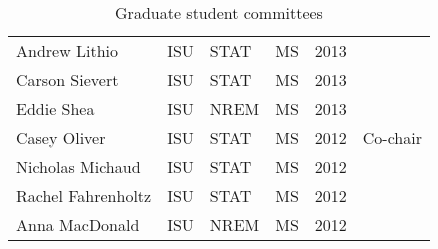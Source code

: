 \begin{table}[h]
\begin{tabular}{llllll}
  Andrew Lithio & ISU & STAT & MS & 2013 &  \\ 
  Carson Sievert & ISU & STAT & MS & 2013 &  \\ 
  Eddie Shea & ISU & NREM & MS & 2013 &  \\ 
  Casey Oliver & ISU & STAT & MS & 2012 & Co-chair \\ 
  Nicholas Michaud & ISU & STAT & MS & 2012 &  \\ 
  Rachel Fahrenholtz & ISU & STAT & MS & 2012 &  \\ 
  Anna MacDonald & ISU & NREM & MS & 2012 &  \\ 
   \hline
\end{tabular}
\caption{Graduate student committees} 
\label{tab:studentcommittees}
\end{table}
